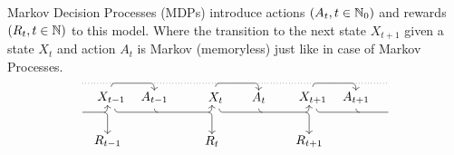 Markov Decision Processes (MDPs) introduce actions \((A_t,t\in\mathbb{N}_0)\) and rewards \((R_t,t\in\mathbb{N})\) to this model. Where the transition to the next state \(X_{t+1}\) given a state \(X_{t}\) and action \(A_{t}\) is Markov (memoryless) just like in case of Markov Processes.
\[
\begin{tikzpicture}
    \draw[dotted] (-3.7,0.4) -- (-2.8,0.4);

    \draw[->] (-3.7, -0.4) %
    to [out=0,in=180] (-3.1, -0.4)
    to [out=0,in=270] (-3, -0.2);

    \draw[->] (-3.1, -0.4) %
    to [out=0,in=90] (-3,-0.5)
    to [out=270, in=90] (-3,-1);

    \draw (-3,-1.2) node {\(R_{t-1}\)};
    \draw (-2.9,0) node {\(X_{t-1}\)};

    \draw[->] (-2.9,0.3) %
    to [out=90,in=180] (-2.8, 0.4) 
    to [out=0,in=180] (-1.8,0.4)
    to [out=0,in=90] (-1.7,0.2);

    \draw[dotted] (-1.7,0.4) -- (0.1,0.4);

    \draw (-1.7,0) node {\(A_{t-1}\)};

    \draw (-1.7, -0.3) %
    to [out=270,in=180] (-1.6,-0.4);

    \draw[->] (-2.8, -0.3) %
    to [out=270,in=180] (-2.7, -0.4) 
    to [out=0,in=180] (-0.2, -0.4)
    to [out=0,in=270] (-0.1, -0.2);

    \draw[->] (-0.2, -0.4) %
    to [out=0,in=90] (-0.1,-0.5)
    to [out=270, in=90] (-0.1,-1);

    \draw (-0.1,-1.2) node {\(R_t\)};
    \draw (0,0) node {\(X_t\)};
    
    \draw[->] (0,0.3)  %
    to [out=90,in=180] (0.1, 0.4) 
    to [out=0,in=180] (1.1,0.4)
    to [out=0,in=90] (1.2,0.2); 

    \draw[dotted] (1.2,0.4) -- (2.8,0.4);
 
    \draw (1.2,0) node {\(A_t\)};

    \draw (1.2, -0.3) %
    to [out=270,in=180] (1.3,-0.4);

    \draw[->] (0.1, -0.3) %
    to [out=270,in=180] (0.2, -0.4) 
    to [out=0,in=180] (2.5, -0.4)
    to [out=0,in=270] (2.6, -0.2);

    \draw[->] (2.5, -0.4) %
    to [out=0,in=90] (2.6,-0.5)
    to [out=270, in=90] (2.6,-1);

    \draw (2.6,-1.2) node {\(R_{t+1}\)};
    \draw (2.7,0) node {\(X_{t+1}\)};

    \draw[->] (2.7,0.3)  %
    to [out=90,in=180] (2.8, 0.4) 
    to [out=0,in=180] (3.8,0.4)
    to [out=0,in=90] (3.9,0.2); 

    \draw[dotted] (3.9,0.4) -- (4.8,0.4);

    \draw (3.9,0) node {\(A_{t+1}\)};

    \draw (3.9, -0.3) %
    to [out=270,in=180] (4,-0.4);

    \draw (2.8, -0.3) %
    to [out=270,in=180] (2.9, -0.4) 
    to [out=0,in=180] (4.8, -0.4);
\end{tikzpicture}
\]
